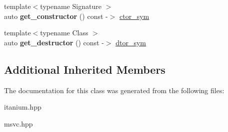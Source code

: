 \begin{DoxyCompactItemize}
\item 
{\footnotesize template$<$typename Signature $>$ }\\auto {\bfseries get\+\_\+constructor} () const  -\/$>$ \hyperlink{a00070}{ctor\+\_\+sym}\hypertarget{a00214_a39ed24b82138433c6f29a3dec1e10d97}{}\label{a00214_a39ed24b82138433c6f29a3dec1e10d97}

\item 
{\footnotesize template$<$typename Class $>$ }\\auto {\bfseries get\+\_\+destructor} () const  -\/$>$ \hyperlink{a00079}{dtor\+\_\+sym}\hypertarget{a00214_af206f4a404ef14b8ad34fd2fcdd988d4}{}\label{a00214_af206f4a404ef14b8ad34fd2fcdd988d4}

\end{DoxyCompactItemize}
\subsection*{Additional Inherited Members}


The documentation for this class was generated from the following files\+:\begin{DoxyCompactItemize}
\item 
itanium.\+hpp\item 
msvc.\+hpp\end{DoxyCompactItemize}
